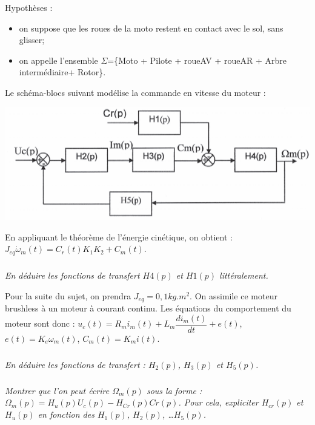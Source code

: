 \documentclass[10pt,fleqn]{article} %
\begin{document}
\begin{multicols}{2}
Hypothèses :
\begin{itemize}
\item on suppose que les roues de la moto restent en contact avec le sol, sans glisser;
\item on appelle l’ensemble $ \Sigma$=\{Moto + Pilote + roueAV + roueAR + Arbre intermédiaire+ Rotor\}.
\end{itemize}
Le schéma-blocs suivant modélise la commande en vitesse du moteur :
\begin{center}
	\includegraphics[width=.9\linewidth]{images/fig_06}
\end{center}


En appliquant le théorème de l'énergie cinétique, on obtient : $J_{eq}\dot{\omega}_m(t)=C_r(t) K_1 K_2 + C_m(t)$.

\subparagraph{}
\textit{En déduire les fonctions de transfert $H4(p)$ et $H1(p)$ littéralement.}
\ifprof
\begin{corrige}
\end{corrige}
\else
\fi

Pour la suite du sujet, on prendra $J_{eq} = {0,1}{kg.m^2}$. On assimile ce moteur brushless à un moteur à courant continu. Les équations du comportement du moteur
sont donc :
$u_c(t) =  R_m i_m(t) + L_m \dfrac{di_m(t)}{dt} + e(t)$, $e (t)= K_e \omega_m (t)$, 
$C_m(t) = K_mi(t)$.



\subparagraph{}
\textit{En déduire les fonctions de transfert : $H_2(p)$, $H_3(p)$ et $H_5(p)$.}
\ifprof
\begin{corrige}
\end{corrige}
\else
\fi


\subparagraph{}
\textit{Montrer que l’on peut écrire  $\Omega_m(p)$ sous la forme :
$\Omega_m(p)=H_u(p)U_c(p)-H_{Cr}(p)Cr(p)$.
Pour cela, expliciter $H_{cr}(p)$ et $H_u(p)$ en fonction des $H_1(p)$, $H_2(p)$, …$H_5(p)$.
}
\ifprof
\begin{corrige}
\end{corrige}
\else
\fi



\end{multicols}
\end{document}

